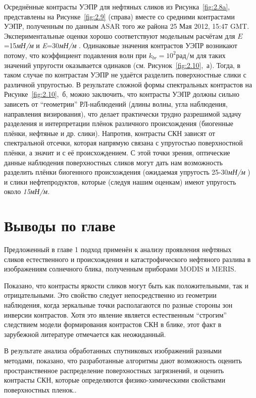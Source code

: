 Осреднённые контрасты УЭПР для нефтяных сликов из Рисунка~\ref{fig:2.8a}, представлены на Рисунке~\ref{fig:2.9} (справа) вместе со средними контрастами УЭПР, полученным по данным ASAR того же района 25 Мая 2012, 15:47 GMT. Экспериментальные оценки хорошо соответствуют модельным расчётам для $E$=15\textit{мН/м }и \textit{E}=30\textit{мН/м }. Одинаковые значения контрастов УЭПР возникают потому, что коэффициент подавления волн при $k_{br} =10^{2} $рад/м для таких значений упругости оказывается одинаков (см. Рисунок~\ref{fig:2.10},~а). Тогда, в таком случае по контрастам УЭПР не удаётся разделить поверхностные слики с различной упругостью. В результате сложной формы спектральных контрастов на Рисунке~\ref{fig:2.10},~б, можно заключить, что контрасты УЭПР должны сильно зависеть от ``геометрии'' РЛ-наблюдений (длины волны, угла наблюдения, направления визирования), что делает практически трудно разрешимой задачу разделения и интерпретации плёнок различного происхождения (биогенные плёнки, нефтяные и др. слики). Напротив, контрасты СКН зависят от спектральной отсечки, которая напрямую связана с упругостью поверхностной плёнки, а значит и с её происхождением. С этой точки зрения, оптические данные наблюдения поверхностных сликов могут дать нам возможность разделить плёнки биогенного происхождения (ожидаемая упругость 25-30\textit{мН/м }) и слики нефтепродуктов, которые (следуя нашим оценкам) имеют упругость около \textit{15мН/м.} 



\newpage



\section{Выводы по главе}



Предложенный в главе 1 подход применён к анализу проявления нефтяных сликов естественного и происхождения и катастрофического нефтяного разлива в изображениям солнечного блика, полученным приборами MODIS и MERIS. 

Показано, что контрасты яркости сликов могут быть как положительными, так и отрицательными. Это свойство следует непосредственно из геометрии наблюдения, когда зеркальные точки располагаются по разные стороны зон инверсии контрастов. Хотя это явление является естественным ``строгим'' следствием модели формирования контрастов СКН в блике, этот факт в зарубежной литературе отмечается как неожиданный.

В результате анализа обработанных спутниковых изображений разными методами, показано, что разработанные алгоритмы дают возможность оценить пространственное распределение поверхностных загрязнений, и оценить контрасты СКН, которые определяются физико-химическими свойствами поверхностных пленок..

